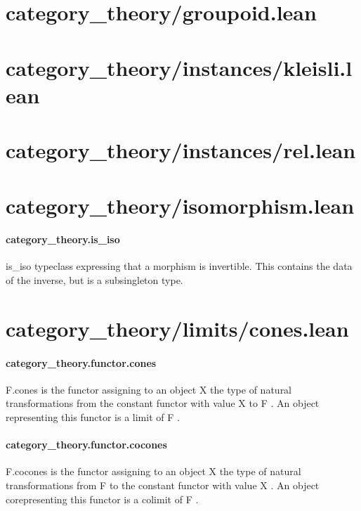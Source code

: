 \documentclass{article}
\begin{document}
\section{category\_theory/groupoid.lean}\section{category\_theory/instances/kleisli.lean}\section{category\_theory/instances/rel.lean}\section{category\_theory/isomorphism.lean}\paragraph{category\_theory.is\_iso}
\par
\colorbox[RGB]{253,246,227}{{{{\color[RGB]{101, 123, 131} is\_iso }}}} typeclass expressing that a morphism is invertible.
This contains the data of the inverse, but is a subsingleton type.
\section{category\_theory/limits/cones.lean}\paragraph{category\_theory.functor.cones}
\par
\colorbox[RGB]{253,246,227}{{{{\color[RGB]{101, 123, 131} F.cones }}}} is the functor assigning to an object 
\colorbox[RGB]{253,246,227}{{{{\color[RGB]{101, 123, 131} X }}}} the type of
natural transformations from the constant functor with value 
\colorbox[RGB]{253,246,227}{{{{\color[RGB]{101, 123, 131} X }}}} to 
\colorbox[RGB]{253,246,227}{{{{\color[RGB]{101, 123, 131} F }}}}.
An object representing this functor is a limit of 
\colorbox[RGB]{253,246,227}{{{{\color[RGB]{101, 123, 131} F }}}}.
\paragraph{category\_theory.functor.cocones}
\par
\colorbox[RGB]{253,246,227}{{{{\color[RGB]{101, 123, 131} F.cocones }}}} is the functor assigning to an object 
\colorbox[RGB]{253,246,227}{{{{\color[RGB]{101, 123, 131} X }}}} the type of
natural transformations from 
\colorbox[RGB]{253,246,227}{{{{\color[RGB]{101, 123, 131} F }}}} to the constant functor with value 
\colorbox[RGB]{253,246,227}{{{{\color[RGB]{101, 123, 131} X }}}}.
An object corepresenting this functor is a colimit of 
\colorbox[RGB]{253,246,227}{{{{\color[RGB]{101, 123, 131} F }}}}.
\end{document}
